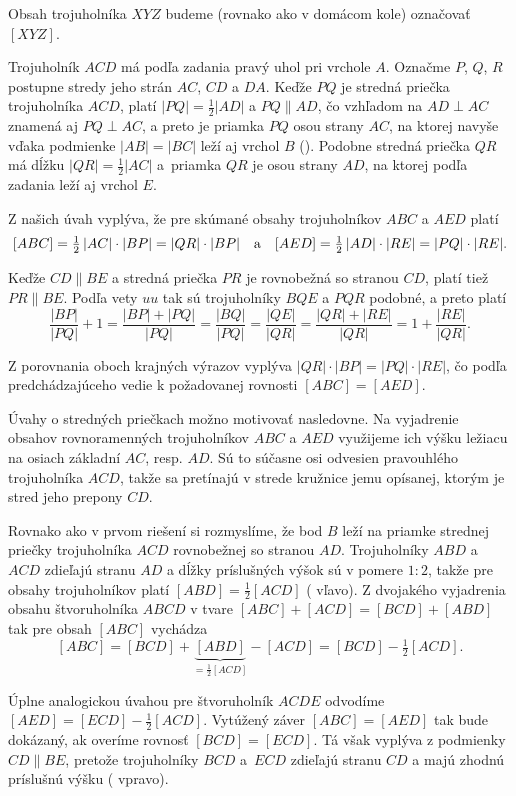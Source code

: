 {%
Obsah trojuholníka $XYZ$ budeme (rovnako ako v domácom kole) označovať $[XYZ]$.

Trojuholník $ACD$ má podľa zadania pravý uhol pri vrchole $A$. Označme $P$, $Q$, $R$ postupne stredy jeho strán $AC$, $CD$ a $DA$.
Keďže $PQ$ je stredná priečka trojuholníka $ACD$, platí $|PQ|=\frac12|AD|$ a $PQ\parallel AD$,
čo vzhľadom na $AD\perp AC$ znamená aj $PQ\perp AC$, a preto je priamka $PQ$
osou strany $AC$, na ktorej navyše vďaka podmienke $|AB|=|BC|$ leží aj vrchol $B$ (\obr).
Podobne stredná priečka $QR$ má dĺžku $|QR|=\frac12|AC|$ a~priamka $QR$ je osou strany $AD$, na ktorej podľa zadania leží aj vrchol $E$.
%

Z našich úvah vyplýva, že pre skúmané obsahy trojuholníkov $ABC$ a $AED$ platí
$$
[ABC]=\tfrac12\,|AC|\cdot |BP|=|QR|\cdot |BP|\quad\hbox{a}\quad
[AED]=\tfrac12\,|AD|\cdot |RE|=|PQ|\cdot |RE|.
$$


Keďže $CD\parallel BE$ a stredná priečka $PR$ je rovnobežná so stranou $CD$, platí tiež $PR\parallel BE$. Podľa vety $uu$ tak sú trojuholníky $BQE$ a $PQR$ podobné, a preto platí
$$
\frac{|BP|}{|PQ|}+1=\frac{|BP|+|PQ|}{|PQ|}=\frac{|BQ|}{|PQ|}=\frac{|QE|}{|QR|}=\frac{|QR|+|RE|}{|QR|}=1+\frac{|RE|}{|QR|}.
$$

Z porovnania oboch krajných výrazov vyplýva $|QR|\cdot |BP|=|PQ|\cdot |RE|$, čo podľa predchádzajúceho vedie k požadovanej rovnosti $[ABC]=[AED]$.


\poznamka
Úvahy o stredných priečkach možno motivovať nasledovne. Na vyjadrenie obsahov rovnoramenných trojuholníkov $ABC$ a $AED$ využijeme ich výšku ležiacu na osiach základní $AC$, resp. $AD$. Sú to súčasne osi odvesien pravouhlého trojuholníka $ACD$, takže sa pretínajú v strede kružnice jemu opísanej, ktorým je stred jeho prepony $CD$.

\ineriesenie
Rovnako ako v prvom riešení si rozmyslíme, že
bod $B$ leží na priamke strednej priečky trojuholníka $ACD$ rovnobežnej so stranou $AD$. Trojuholníky $ABD$ a~$ACD$ zdieľajú stranu $AD$ a dĺžky príslušných výšok sú v pomere $1:2$, takže pre obsahy trojuholníkov platí $[ABD]=\frac12[ACD]$ (\obr{} vľavo). Z dvojakého vyjadrenia obsahu štvoruholníka $ABCD$ v tvare $[ABC]+[ACD]=[BCD]+[ABD]$ tak pre obsah $[ABC]$ vychádza
$$
[ABC]=[BCD]+\underbrace{[ABD]}_{=\frac12[ACD]}-[ACD] =[BCD]-\tfrac12[ACD].
$$

Úplne analogickou úvahou pre štvoruholník $ACDE$ odvodíme $[AED]=[ECD]-\frac12[ACD]$. Vytúžený záver $[ABC]=[AED]$ tak bude dokázaný, ak overíme rovnosť $[BCD]=[ECD]$. Tá však vyplýva z podmienky $CD\parallel BE$, pretože trojuholníky $BCD$ a~$ECD$ zdieľajú stranu $CD$ a majú zhodnú príslušnú výšku ( vpravo).
%

}
